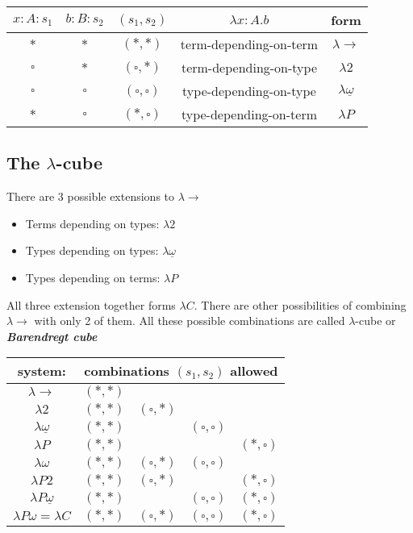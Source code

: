 \documentclass[12pt, a4paper]{article}
\begin{document}
\begin{center}
    \begin{tabular}{| c | c | c || c | c |} 
     \hline
     $x : A : s_1$ & $b : B : s_2$ & $(s_1, s_2)$ & $\lambda x : A. b$ & form \\
     \hline
     $*$ & $*$ & $(*,*)$ & term-depending-on-term & $\lambda \to$\\
     $\square$ & $*$ & $(\square,*)$ & term-depending-on-type & $\lambda 2$\\
     $\square$ & $\square$ & $(\square,\square)$ & type-depending-on-type & $\lambda \underline\omega$\\
     $*$ & $\square$ & $(*,\square)$ & type-depending-on-term & $\lambda P$\\
     \hline
   \end{tabular}
\end{center}

\subsection{The \texorpdfstring{$\lambda$-cube}{}}\label{sub:lambda:cube}
There are 3 possible extensions to $\lambda \to$
\begin{itemize}
    \item Terms depending on types: $\lambda 2$
    \item Types depending on types: $\lambda \underline{\omega}$
    \item Types depending on terms: $\lambda P$
\end{itemize}

All three extension together forms $\lambda C$. There are other possibilities of combining $\lambda \to$ with only 2 of them.
All these possible combinations are called $\lambda$-cube or \textbf{\textit{Barendregt cube}}~\cite{barendregt}

\begin{center}
    \begin{tabular}{|c | c c c c |} 
    \multicolumn{1}{c}{system:} & \multicolumn{4}{c}{combinations $(s_1, s_2)$ allowed } \\
     \hline
     $\lambda\to$ & $(*,*)$ & & &\\
     $\lambda 2$ & $(*,*)$ & $(\square, *)$& &\\
     $\lambda\underline{\omega}$ & $(*,*)$ & & $(\square, \square)$ &\\
     $\lambda P$ & $(*,*)$ & & &$(*, \square)$\\
     $\lambda \omega$ & $(*,*)$ &$(\square, *)$ & $(\square, \square)$&\\
     $\lambda P 2$ & $(*,*)$ &$(\square, *)$ & &$(*, \square)$\\
     $\lambda P \underline \omega$ & $(*,*)$ & &$(\square, \square)$ &$(*, \square)$\\
     $\lambda P \omega = \lambda C$ & $(*,*)$ &$(\square, *)$ & $(\square, \square)$&$(*, \square)$\\
     \hline
   \end{tabular}
\end{center}
\end{document}
